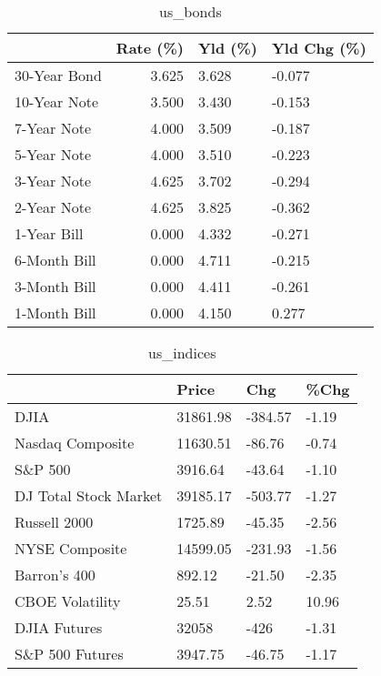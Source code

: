 \documentclass{article}%
\begin{document}
%


\begin{table}[htbp]%
\caption{us\_bonds}%
\centering%
\begin{adjustbox}{width=1\textwidth}%
\begin{tabular}{lrll}
\toprule
             &  Rate (\%) & Yld (\%) & Yld Chg (\%) \\
\midrule
30-Year Bond &     3.625 &   3.628 &      -0.077 \\
10-Year Note &     3.500 &   3.430 &      -0.153 \\
 7-Year Note &     4.000 &   3.509 &      -0.187 \\
 5-Year Note &     4.000 &   3.510 &      -0.223 \\
 3-Year Note &     4.625 &   3.702 &      -0.294 \\
 2-Year Note &     4.625 &   3.825 &      -0.362 \\
 1-Year Bill &     0.000 &   4.332 &      -0.271 \\
6-Month Bill &     0.000 &   4.711 &      -0.215 \\
3-Month Bill &     0.000 &   4.411 &      -0.261 \\
1-Month Bill &     0.000 &   4.150 &       0.277 \\
\bottomrule
\end{tabular}
%
\end{adjustbox}%
\end{table}

%


\begin{table}[htbp]%
\caption{us\_indices}%
\centering%
\begin{adjustbox}{width=1\textwidth}%
\begin{tabular}{llll}
\toprule
                      &    Price &     Chg &  \%Chg \\
\midrule
                 DJIA & 31861.98 & -384.57 & -1.19 \\
     Nasdaq Composite & 11630.51 &  -86.76 & -0.74 \\
              S\&P 500 &  3916.64 &  -43.64 & -1.10 \\
DJ Total Stock Market & 39185.17 & -503.77 & -1.27 \\
         Russell 2000 &  1725.89 &  -45.35 & -2.56 \\
       NYSE Composite & 14599.05 & -231.93 & -1.56 \\
         Barron's 400 &   892.12 &  -21.50 & -2.35 \\
      CBOE Volatility &    25.51 &    2.52 & 10.96 \\
         DJIA Futures &    32058 &    -426 & -1.31 \\
      S\&P 500 Futures &  3947.75 &  -46.75 & -1.17 \\
\bottomrule
\end{tabular}
%
\end{adjustbox}%
\end{table}
\end{document}
